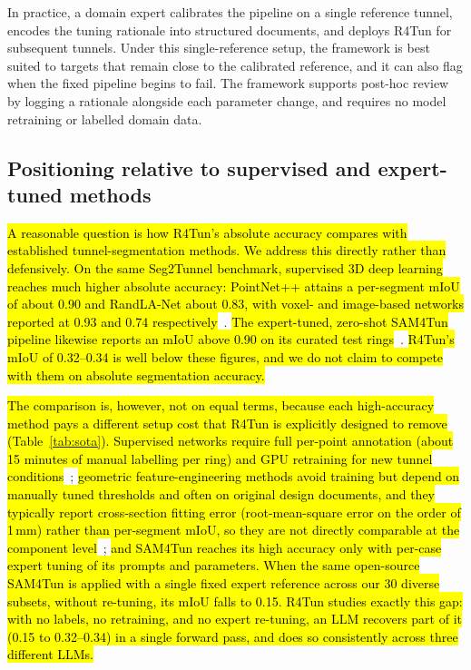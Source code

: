 \documentclass[a4paper,fleqn]{cas-dc}
\newcommand{\hlcite}[1]{\hl{\cite{#1}}}
\begin{document}
{In practice, a domain expert calibrates the pipeline on a single reference tunnel, encodes the tuning rationale into structured documents, and deploys R4Tun for subsequent tunnels. Under this single-reference setup, the framework is best suited to targets that remain close to the calibrated reference, and it can also flag when the fixed pipeline begins to fail. The framework supports post-hoc review by logging a rationale alongside each parameter change, and requires no model retraining or labelled domain data.


\subsection{Positioning relative to supervised and expert-tuned methods}\label{sec:positioning}

\hl{A reasonable question is how R4Tun's absolute accuracy compares with established tunnel-segmentation methods. We address this directly rather than defensively. On the same Seg2Tunnel benchmark, supervised 3D deep learning reaches much higher absolute accuracy: PointNet++ attains a per-segment mIoU of about 0.90 and RandLA-Net about 0.83, with voxel- and image-based networks reported at 0.93 and 0.74 respectively}~\hlcite{lin2024seg2tunnel}. \hl{The expert-tuned, zero-shot SAM4Tun pipeline likewise reports an mIoU above 0.90 on its curated test rings}~\hlcite{ye2025sam4tun}. \hl{R4Tun's mIoU of 0.32--0.34 is well below these figures, and we do not claim to compete with them on absolute segmentation accuracy.}

\hl{The comparison is, however, not on equal terms, because each high-accuracy method pays a different setup cost that R4Tun is explicitly designed to remove (Table~\ref{tab:sota}). Supervised networks require full per-point annotation (about 15 minutes of manual labelling per ring) and GPU retraining for new tunnel conditions}~\hlcite{lin2024seg2tunnel}; \hl{geometric feature-engineering methods avoid training but depend on manually tuned thresholds and often on original design documents, and they typically report cross-section fitting error (root-mean-square error on the order of 1\,mm) rather than per-segment mIoU, so they are not directly comparable at the component level}~\hlcite{fischler1981ransac,weidner2024generalized}; \hl{and SAM4Tun reaches its high accuracy only with per-case expert tuning of its prompts and parameters. When the same open-source SAM4Tun is applied with a single fixed expert reference across our 30 diverse subsets, without re-tuning, its mIoU falls to 0.15. R4Tun studies exactly this gap: with no labels, no retraining, and no expert re-tuning, an LLM recovers part of it (0.15 to 0.32--0.34) in a single forward pass, and does so consistently across three different LLMs.}

}
\end{document}
